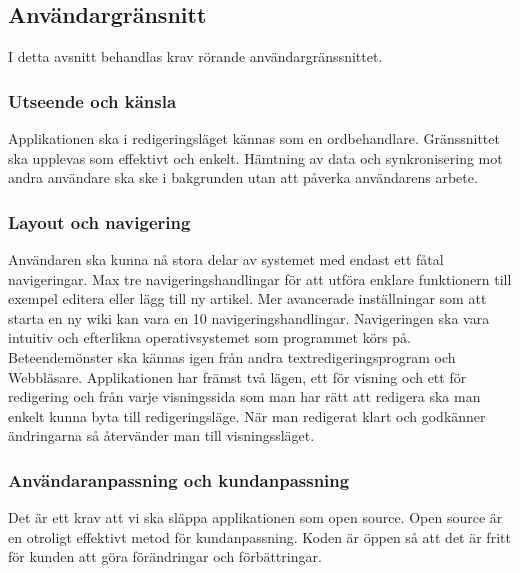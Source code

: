 \subsection{Användargränsnitt}
I detta avsnitt behandlas krav rörande användargränssnittet. 

\subsubsection{Utseende och känsla}
Applikationen ska i redigeringsläget kännas som en ordbehandlare. Gränssnittet ska upplevas som effektivt och enkelt. Hämtning av data och synkronisering mot andra användare ska ske i bakgrunden utan att påverka användarens arbete. 

\subsubsection{Layout och navigering}
Användaren ska kunna nå stora delar av systemet med endast ett fåtal navigeringar. Max tre navigeringshandlingar för att utföra enklare funktionern till exempel editera eller lägg till ny artikel. Mer avancerade inställningar som att starta en ny wiki kan vara en 10 navigeringshandlingar. Navigeringen ska vara intuitiv och efterlikna operativsystemet som programmet körs på. Beteendemönster ska kännas igen från andra textredigeringsprogram och Webbläsare. Applikationen har främst två lägen, ett för visning och ett för redigering och från varje visningssida som man har rätt att redigera ska man enkelt kunna byta till redigeringsläge. När man redigerat klart och godkänner ändringarna så återvänder man till visningssläget.


\subsubsection{Användaranpassning och kundanpassning}
Det är ett krav att vi ska släppa applikationen som open source. Open source är en otroligt effektivt metod för kundanpassning. Koden är öppen så att det är fritt för kunden att göra förändringar och förbättringar. 

